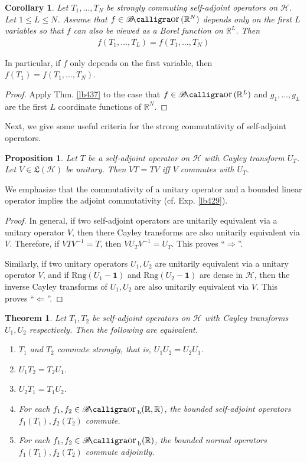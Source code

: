\documentclass[12pt,b5paper,notitlepage]{article}
\theoremstyle{definition}
\theoremstyle{plain}
\newtheorem{thm}[df]{Theorem}
\newtheorem{pp}[df]{Proposition}
\newtheorem{co}[df]{Corollary}
\DeclareMathOperator{\Bor}{\mathscr{B}\text{\kern -2pt {\calligra\large or}}\,}
\DeclareMathOperator{\Borb}{{\mathscr{B}\text{\kern -2pt {\calligra\large or}}\,}_{\mathrm b}}
\newcommand{\fk}{\mathfrak}
\newcommand{\idt}{\mathbf{1}}
\newcommand{\Rbb}{\mathbb R}
\newcommand{\Rng}{\mathrm{Rng}}
\newcommand{\MH}{\mathcal H}
\numberwithin{equation}{section}
\begin{document}
\begin{co}\label{lb439}
Let $T_1,\dots,T_N$ be strongly commuting self-adjoint operators on $\MH$. Let $1\leq L\leq N$. Assume that $f\in\Bor(\Rbb^N)$ depends only on the first $L$ variables so that $f$ can also be viewed as a Borel function on $\Rbb^L$. Then
\begin{align*}
f(T_1,\dots,T_L)=f(T_1,\dots,T_N)
\end{align*} 
\end{co}

In particular, if $f$ only depends on the first variable, then $f(T_1)=f(T_1,\dots,T_N)$.

\begin{proof}
Apply Thm. \ref{lb437} to the case that $f\in\Bor(\Rbb^L)$ and $g_1,\dots,g_L$ are the first $L$ coordinate functions of $\Rbb^N$.
\end{proof}

Next, we give some useful criteria for the strong commutativity of self-adjoint operators.

\begin{pp}\label{lb438}
Let $T$ be a self-adjoint operator on $\MH$ with Cayley transform $U_T$. Let $V\in\fk L(\MH)$ be unitary. Then $VT=TV$ iff $V$ commutes with $U_T$.
\end{pp}

We emphasize that the commutativity of a unitary operator and a bounded linear operator implies the adjoint commutativity (cf. Exp. \ref{lb429}).

\begin{proof}
In general, if two self-adjoint operators are unitarily equivalent via a unitary operator $V$, then there Cayley transforms are also unitarily equivalent via $V$. Therefore, if $VTV^{-1}=T$, then $VU_TV^{-1}=U_T$. This proves ``$\Rightarrow$''.

Similarly, if two unitary operators $U_1,U_2$ are unitarily equivalent via a unitary operator $V$, and if $\Rng(U_1-\idt)$ and $\Rng(U_2-\idt)$ are dense in $\MH$, then the inverse Cayley transforms of $U_1,U_2$ are also unitarily equivalent via $V$. This proves ``$\Leftarrow$''.
\end{proof}



\begin{thm}
Let $T_1,T_2$ be self-adjoint operators on $\MH$ with Cayley transforms $U_1,U_2$ respectively. Then the following are equivalent.
\begin{enumerate}[label=(\arabic*)]
\item $T_1$ and $T_2$ commute strongly, that is, $U_1U_2=U_2U_1$.
\item $U_1T_2=T_2U_1$.
\item $U_2T_1=T_1U_2$.
\item For each $f_1,f_2\in\Borb(\Rbb,\Rbb)$, the bounded self-adjoint operators $f_1(T_1),f_2(T_2)$ commute.
\item For each $f_1,f_2\in\Borb(\Rbb)$, the bounded normal operators $f_1(T_1),f_2(T_2)$ commute adjointly.
\end{enumerate}
\end{thm}
\end{document}
